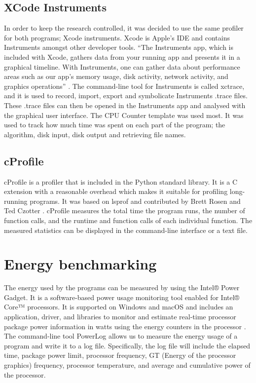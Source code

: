 \subsection{XCode Instruments}
In order to keep the research controlled, it was decided to use the same profiler for both programs; Xcode instruments. Xcode is Apple’s IDE and contains Instruments amongst other developer tools. “The Instruments app, which is included with Xcode, gathers data from your running app and presents it in a graphical timeline. With Instruments, one can gather data about performance areas such as our app’s memory usage, disk activity, network activity, and graphics operations” \cite{instruments}. The command-line tool for Instruments is called xctrace, and it is used to record, import, export and symbolicate Instruments .trace files. These .trace files can then be opened in the Instruments app and analysed with the graphical user interface. The CPU Counter template was used most. It was used to track how much time was spent on each part of the program; the algorithm, disk input, disk output and retrieving file names.

\subsection{cProfile}
cProfile is a profiler that is included in the Python standard library. It is a C extension with a reasonable overhead which makes it suitable for profiling long-running programs. It was based on lsprof and contributed by Brett Rosen and Ted Czotter \cite{cprofile}. cProfile measures the total time the program runs, the number of function calls, and the runtime and function calls of each individual function. The measured statistics can be displayed in the command-line interface or a text file.

\section{Energy benchmarking}
The energy used by the programs can be measured by using the Intel® Power Gadget. It is a software-based power usage monitoring tool enabled for Intel® Core™ processors. It is supported on Windows and macOS and includes an application, driver, and libraries to monitor and estimate real-time processor package power information in watts using the energy counters in the processor \cite{powergadget}. The command-line tool PowerLog allows us to measure the energy usage of a program and write it to a log file. Specifically, the log file will include the elapsed time, package power limit, processor frequency, GT (Energy of the processor graphics) frequency, processor temperature, and average and cumulative power of the processor.

